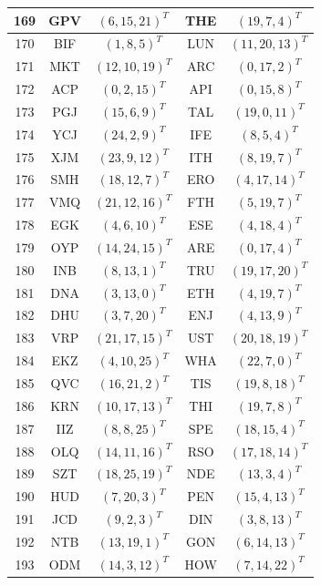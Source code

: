 \begin{longtable}{|c|c|c|c|c|}
  \hline
  169 & GPV & $(6, 15, 21)^T$ & THE & $(19, 7, 4)^T$ \\
  \hline
  170 & BIF & $(1, 8, 5)^T$ & LUN & $(11, 20, 13)^T$ \\
  \hline
  171 & MKT & $(12, 10, 19)^T$ & ARC & $(0, 17, 2)^T$ \\
  \hline
  172 & ACP & $(0, 2, 15)^T$ & API & $(0, 15, 8)^T$ \\
  \hline
  173 & PGJ & $(15, 6, 9)^T$ & TAL & $(19, 0, 11)^T$ \\
  \hline
  174 & YCJ & $(24, 2, 9)^T$ & IFE & $(8, 5, 4)^T$ \\
  \hline
  175 & XJM & $(23, 9, 12)^T$ & ITH & $(8, 19, 7)^T$ \\
  \hline
  176 & SMH & $(18, 12, 7)^T$ & ERO & $(4, 17, 14)^T$ \\
  \hline
  177 & VMQ & $(21, 12, 16)^T$ & FTH & $(5, 19, 7)^T$ \\
  \hline
  178 & EGK & $(4, 6, 10)^T$ & ESE & $(4, 18, 4)^T$ \\
  \hline
  179 & OYP & $(14, 24, 15)^T$ & ARE & $(0, 17, 4)^T$ \\
  \hline
  180 & INB & $(8, 13, 1)^T$ & TRU & $(19, 17, 20)^T$ \\
  \hline
  181 & DNA & $(3, 13, 0)^T$ & ETH & $(4, 19, 7)^T$ \\
  \hline
  182 & DHU & $(3, 7, 20)^T$ & ENJ & $(4, 13, 9)^T$ \\
  \hline
  183 & VRP & $(21, 17, 15)^T$ & UST & $(20, 18, 19)^T$ \\
  \hline
  184 & EKZ & $(4, 10, 25)^T$ & WHA & $(22, 7, 0)^T$ \\
  \hline
  185 & QVC & $(16, 21, 2)^T$ & TIS & $(19, 8, 18)^T$ \\
  \hline
  186 & KRN & $(10, 17, 13)^T$ & THI & $(19, 7, 8)^T$ \\
  \hline
  187 & IIZ & $(8, 8, 25)^T$ & SPE & $(18, 15, 4)^T$ \\
  \hline
  188 & OLQ & $(14, 11, 16)^T$ & RSO & $(17, 18, 14)^T$ \\
  \hline
  189 & SZT & $(18, 25, 19)^T$ & NDE & $(13, 3, 4)^T$ \\
  \hline
  190 & HUD & $(7, 20, 3)^T$ & PEN & $(15, 4, 13)^T$ \\
  \hline
  191 & JCD & $(9, 2, 3)^T$ & DIN & $(3, 8, 13)^T$ \\
  \hline
  192 & NTB & $(13, 19, 1)^T$ & GON & $(6, 14, 13)^T$ \\
  \hline
  193 & ODM & $(14, 3, 12)^T$ & HOW & $(7, 14, 22)^T$ \\

\end{longtable}

